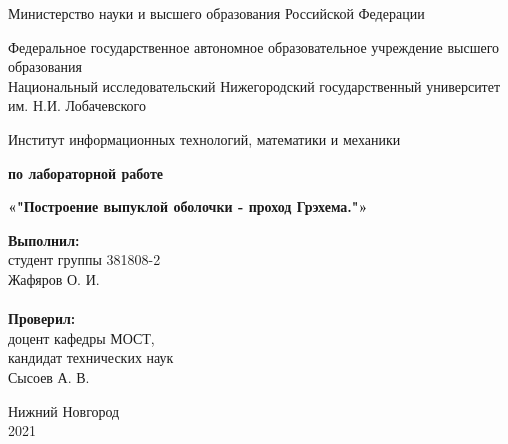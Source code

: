 \documentclass{report}
\begin{document}
\begin{titlepage}

\begin{center}
Министерство науки и высшего образования Российской Федерации
\end{center}

\begin{center}
Федеральное государственное автономное образовательное учреждение высшего образования \\
Национальный исследовательский Нижегородский государственный университет им. Н.И. Лобачевского
\end{center}

\begin{center}
Институт информационных технологий, математики и механики
\end{center}

\vspace{4em}

\begin{center}
\textbf{ по лабораторной работе} \\
\end{center}
\begin{center}
\textbf{\Large«"Построение выпуклой оболочки - проход Грэхема."»} \\
\end{center}

\vspace{4em}

\newbox{\lbox}
\newlength{\maxl}
\setlength{\maxl}{\wd\lbox}
\hfill\parbox{7cm}{
\hspace*{5cm}\hspace*{-5cm}\textbf{Выполнил:} \\ студент группы 381808-2 \\ Жафяров О. И.\\
\\
\hspace*{5cm}\hspace*{-5cm}\textbf{Проверил:}\\ доцент кафедры МОСТ, \\ кандидат технических наук \\ Сысоев А. В.\\
}
\vspace{\fill}

\begin{center} Нижний Новгород \\ 2021 \end{center}

\end{titlepage}
\end{document}
